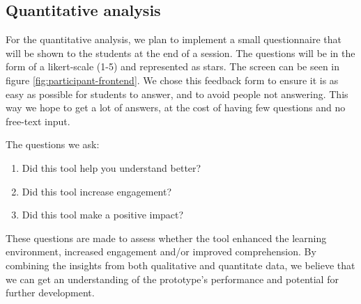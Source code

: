 \subsection{Quantitative analysis}
For the quantitative analysis, we plan to implement a small questionnaire that will be shown to the students at the end of a session. The questions will be in the form of a likert-scale (1-5) and represented as stars. The screen can be seen in figure \ref{fig:participant-frontend}. We chose this feedback form to ensure it is as easy as possible for students to answer, and to avoid people not answering. This way we hope to get a lot of answers, at the cost of having few questions and no free-text input. 

The questions we ask:
\begin{enumerate}
    \item Did this tool help you understand better?
    \item Did this tool increase engagement?
    \item Did this tool make a positive impact?
\end{enumerate}

These questions are made to assess whether the tool enhanced the learning environment, increased engagement and/or improved comprehension. By combining the insights from both qualitative and quantitate data, we believe that we can get an understanding of the prototype's performance and potential for further development.



